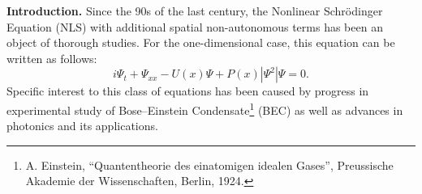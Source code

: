 \documentclass[candidate, href, colorlinks]{disser}
\begin{document}
%	
%	
%
%
%
%
%
%


\textbf{Introduction.}
Since the 90s of the last century, the Nonlinear Schr\"odinger Equation (NLS) with additional spatial non-autonomous terms has been an object of thorough studies.
For the one-dimensional case, this equation can be written as follows:
\begin{equation}
	i \Psi_t + \Psi_{xx} - U(x) \Psi + P(x) |\Psi^2| \Psi = 0.
\label{eq:gpe}
\end{equation}
Specific interest to this class of equations has been caused by progress in experimental study of Bose--Einstein Condensate\footnote{A. Einstein, ``Quantentheorie des einatomigen idealen Gases'', Preussische Akademie der Wissenschaften, Berlin, 1924.} (BEC) as well as advances in photonics and its applications.
\end{document}
